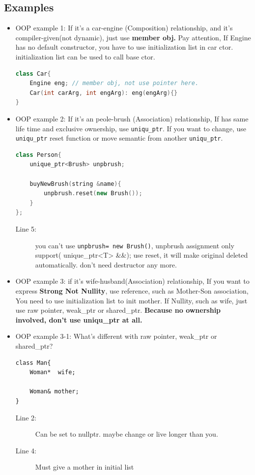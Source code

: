 \documentclass[a4paper,11pt,twoside]{book}
\begin{document}
\subsection{Examples}
\begin{itemize}
	\item OOP example 1: If it's a car-engine (Composition) relationship, and it's compiler-given(not dynamic), just use \textbf{member obj.}   Pay attention, If Engine has no default constructor, you have to use initialization list in car ctor.  initialization list can be used to call base ctor.
\begin{lstlisting}[frame=single, language=c++]
class Car{
	Engine eng; // member obj, not use pointer here.
	Car(int carArg, int engArg): eng(engArg){}
}
	\end{lstlisting}
	
	
	\item OOP example 2:  If it's an peole-brush (Association) relationship, If has same life time and exclusive ownership, use \texttt{uniqu\_ptr}. If you want to change, use \texttt{uniqu\_ptr} reset function or move semantic from another \texttt{uniqu\_ptr}.
\begin{lstlisting}[frame=single, language=c++]
class Person{
	unique_ptr<Brush> unpbrush;
	
	buyNewBrush(string &name){
		unpbrush.reset(new Brush());
	}
};
\end{lstlisting}
\begin{description}
	\item[Line 5:] you can't use \texttt{unpbrush= new Brush()}, unpbrush assignment only support( unique\_ptr<T> \&\&); use reset, it will make original deleted automatically. don't need destructor any more.
\end{description}
	
	\item OOP example 3: if it's wife-husband(Association) relationship, If you want to express \textbf{Strong Not Nullity}, use reference, such as Mother-Son association, You need to use initialization list to init mother. If Nullity, such as wife, just use raw pointer, weak\_ptr or shared\_ptr. \textbf{Because no ownership involved, don't use uniqu\_ptr at all. }
	
	\item OOP example 3-1: What's different with raw pointer, weak\_ptr or shared\_ptr?
	\begin{lstlisting}[]
class Man{
	Woman*  wife; 
	
	Woman& mother; 
}
\end{lstlisting}
\begin{description}
	\item[Line 2:] Can be set to nullptr. maybe change or live longer than you.
	\item[Line 4:] Must give a mother in initial list
\end{description}
	

\end{itemize}
\end{document}
